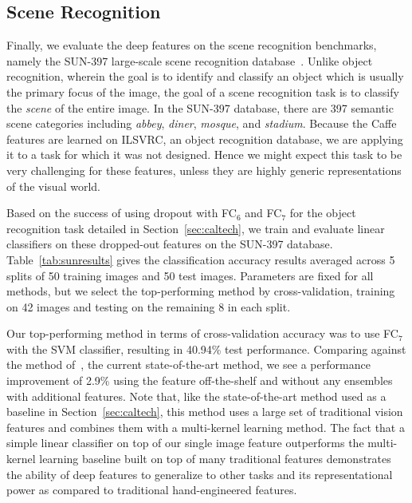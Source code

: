 \subsection{Scene Recognition}
Finally, we evaluate the deep features on the scene recognition benchmarks, namely the SUN-397 large-scale scene recognition database~\cite{xiao10}. Unlike object recognition, wherein the goal is to identify and classify an object which is usually the primary focus of the image, the goal of a scene recognition task is to classify the \textit{scene} of the entire image.
In the SUN-397 database, there are 397 semantic scene categories including \textit{abbey}, \textit{diner}, \textit{mosque}, and \textit{stadium}.
Because the Caffe features are learned on ILSVRC, an object recognition database, we are applying it to a task for which it was not designed.
Hence we might expect this task to be very challenging for these features, unless they are highly generic representations of the visual world.

Based on the success of using dropout with FC$_6$ and FC$_7$ for the object recognition task detailed in Section~\ref{sec:caltech}, we train and evaluate linear classifiers on these dropped-out features on the SUN-397 database.
Table~\ref{tab:sunresults} gives the classification accuracy results averaged across 5 splits of 50 training images and 50 test images.
Parameters are fixed for all methods, but we select the top-performing method by cross-validation, training on 42 images and testing on the remaining 8 in each split.

Our top-performing method in terms of cross-validation accuracy was to use FC$_7$ with the SVM classifier, resulting in 40.94\% test performance.
Comparing against the method of~\cite{xiao10}, the current state-of-the-art method, we see a performance improvement of 2.9\% using the feature off-the-shelf and without any ensembles with additional features.
Note that, like the state-of-the-art method used as a baseline in Section~\ref{sec:caltech}, this method uses a large set of traditional vision features and combines them with a multi-kernel learning method.
The fact that a simple linear classifier on top of our single image feature outperforms the multi-kernel learning baseline built on top of many traditional features demonstrates the ability of deep features to generalize to other tasks and its representational power as compared to traditional hand-engineered features.

